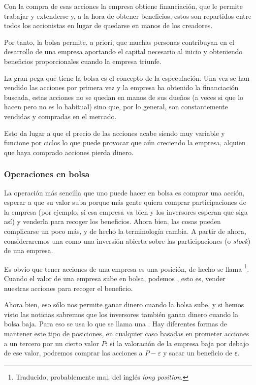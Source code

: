 \documentclass[nochap,palatino,shortheader]{apuntes}
\begin{document}
Con la compra de esas acciones la empresa obtiene financiación, que le permite trabajar y extenderse y, a la hora de obtener beneficios, estos son repartidos entre todos los accionistas en lugar de quedarse en manos de los creadores.

Por tanto, la bolsa permite, a priori, que muchas personas contribuyan en el desarrollo de una empresa aportando el capital necesario al inicio y obteniendo beneficios proporcionales cuando la empresa triunfe.

La gran pega que tiene la bolsa es el concepto de la especulación. Una vez se han vendido las acciones por primera vez y la empresa ha obtenido la financiación buscada, estas acciones no se quedan en manos de sus dueños (a veces si que lo hacen pero no es lo habitual) sino que, por lo general, son constantemente vendidas y compradas en el mercado.

Esto da lugar a que el precio de las acciones acabe siendo muy variable y funcione por ciclos lo que puede provocar que aún creciendo la empresa, alquien que haya comprado acciones pierda dinero.


\subsubsection{Operaciones en bolsa}

La operación más sencilla que uno puede hacer en bolsa es comprar una acción, esperar a que su valor suba porque más gente quiera comprar participaciones de la empresa (por ejemplo, si esa empresa va bien y los inversores esperan que siga así) y venderla para recoger los beneficios. Ahora bien, las cosas pueden complicarse un poco más, y de hecho la terminología cambia. A partir de ahora, consideraremos una  como una inversión abierta sobre las participaciones (o \textit{stock}) de una empresa.

Es obvio que tener acciones de una empresa es una posición, de hecho se llama \footnote{Traducido, probablemente mal, del inglés \textit{long position}.}. Cuando el valor de una empresa sube en bolsa, podemos , esto es, vender nuestras acciones para recoger el beneficio.

Ahora bien, eso sólo nos permite ganar dinero cuando la bolsa sube, y si hemos visto las noticias sabremos que los inversores también ganan dinero cuando la bolsa baja. Para eso se usa lo que se llama una . Hay diferentes formas de mantener este tipo de posiciones, en cualquier caso basadas en prometer acciones a un tercero por un cierto valor $P$: si la valoración de la empresa baja por debajo de ese valor, podremos comprar las  acciones a $P - ε$ y sacar un beneficio de ε.
\end{document}
